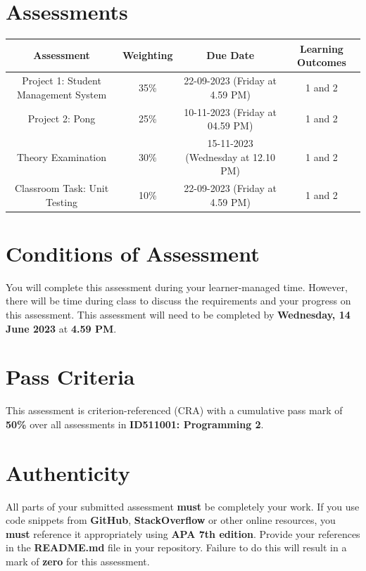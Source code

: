 \documentclass{article}
\begin{document}
\section*{Assessments}
\renewcommand{\arraystretch}{1.5}
\begin{tabular}{|c|c|c|c|}
	\hline
	\textbf{Assessment}                                 & \textbf{Weighting} & \textbf{Due Date}            & \textbf{Learning Outcomes} \\ \hline
	\small Project 1: Student Management System  & \small 35\%        & \small 22-09-2023 (Friday at 4.59 PM)   & \small 1 and 2                   \\ \hline
	\small Project 2: Pong & \small 25\%        & \small 10-11-2023 (Friday at 04.59 PM)  & \small 1 and 2                   \\ \hline
	\small Theory Examination                        & \small 30\%        & \small 15-11-2023 (Wednesday at 12.10 PM)  & \small 1 and 2                   \\ \hline
	\small Classroom Task: Unit Testing                       & \small 10\%        & \small 22-09-2023 (Friday at 4.59 PM)  & \small 1 and 2                   \\ \hline
\end{tabular} 

\section*{Conditions of Assessment}
You will complete this assessment during your learner-managed time. However, there will be time during class to discuss the requirements and your progress on this assessment. This assessment will need to be completed by \textbf{Wednesday, 14 June 2023} at \textbf{4.59 PM}.

\section*{Pass Criteria}
This assessment is criterion-referenced (CRA) with a cumulative pass mark of \textbf{50\%} over all assessments in \textbf{ID511001: Programming 2}.

\section*{Authenticity}
All parts of your submitted assessment \textbf{must} be completely your work. If you use code snippets from \textbf{GitHub}, \textbf{StackOverflow} or other online resources, you \textbf{must} reference it appropriately using \textbf{APA 7th edition}. Provide your references in the \textbf{README.md} file in your repository. Failure to do this will result in a mark of \textbf{zero} for this assessment.
\end{document}
